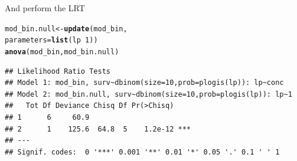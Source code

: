 \documentclass{scrartcl}\usepackage[]{graphicx}\usepackage[]{color}
\makeatletter
\newcommand{\hlnum}[1]{\textcolor[rgb]{0.686,0.059,0.569}{#1}}%
\newcommand{\hlopt}[1]{\textcolor[rgb]{0,0,0}{#1}}%
\newcommand{\hlstd}[1]{\textcolor[rgb]{0.345,0.345,0.345}{#1}}%
\newcommand{\hlkwb}[1]{\textcolor[rgb]{0.69,0.353,0.396}{#1}}%
\newcommand{\hlkwc}[1]{\textcolor[rgb]{0.333,0.667,0.333}{#1}}%
\newcommand{\hlkwd}[1]{\textcolor[rgb]{0.737,0.353,0.396}{\textbf{#1}}}%
\newenvironment{kframe}{%
 \def\at@end@of@kframe{}%
 \ifinner\ifhmode%
  \def\at@end@of@kframe{\end{minipage}}%
  \begin{minipage}{\columnwidth}%
 \fi\fi%
 \def\FrameCommand##1{\hskip\@totalleftmargin \hskip-\fboxsep
 \colorbox{shadecolor}{##1}\hskip-\fboxsep
     \hskip-\linewidth \hskip-\@totalleftmargin \hskip\columnwidth}%
 \MakeFramed {\advance\hsize-\width
   \@totalleftmargin\z@ \linewidth\hsize
   \@setminipage}}%
 {\par\unskip\endMakeFramed%
 \at@end@of@kframe}
\newenvironment{knitrout}{}{} %
\makeatother
\begin{document}
And perform the LRT
\begin{knitrout}
\color{fgcolor}\begin{kframe}
\begin{alltt}
\hlstd{mod_bin.null} \hlkwb{<-} \hlkwd{update}\hlstd{(mod_bin,}
                       \hlkwc{parameters} \hlstd{=} \hlkwd{list}\hlstd{(lp} \hlopt{~} \hlnum{1}\hlstd{))}
\hlkwd{anova}\hlstd{(mod_bin, mod_bin.null)}
\end{alltt}
\begin{verbatim}
## Likelihood Ratio Tests
## Model 1: mod_bin, surv~dbinom(size=10,prob=plogis(lp)): lp~conc
## Model 2: mod_bin.null, surv~dbinom(size=10,prob=plogis(lp)): lp~1
##   Tot Df Deviance Chisq Df Pr(>Chisq)    
## 1      6     60.9                        
## 2      1    125.6  64.8  5    1.2e-12 ***
## ---
## Signif. codes:  0 '***' 0.001 '**' 0.01 '*' 0.05 '.' 0.1 ' ' 1
\end{verbatim}
\end{kframe}
\end{knitrout}
\end{document}
